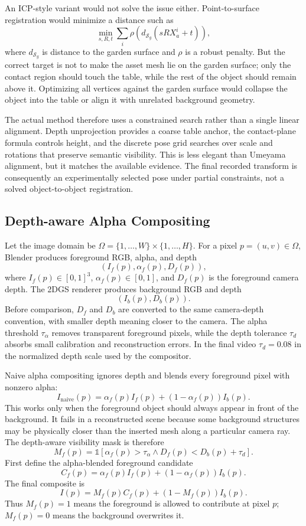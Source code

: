 \documentclass[10pt,twocolumn,letterpaper]{article}
\begin{document}
An ICP-style variant would not solve the issue either.
Point-to-surface registration would minimize a distance such as
\[
\min_{s,R,t}\sum_i
\rho\!\left(
d_{\mathcal{S}_g}(sRX_a^i+t)
\right),
\]
where $d_{\mathcal{S}_g}$ is distance to the garden surface and $\rho$ is a robust penalty.
But the correct target is not to make the asset mesh lie on the garden surface; only the contact region should touch the table, while the rest of the object should remain above it.
Optimizing all vertices against the garden surface would collapse the object into the table or align it with unrelated background geometry.

The actual method therefore uses a constrained search rather than a single linear alignment.
Depth unprojection provides a coarse table anchor, the contact-plane formula controls height, and the discrete pose grid searches over scale and rotations that preserve semantic visibility.
This is less elegant than Umeyama alignment, but it matches the available evidence.
The final recorded transform is consequently an experimentally selected pose under partial constraints, not a solved object-to-object registration.

\subsection{Depth-aware Alpha Compositing}
Let the image domain be $\Omega=\{1,\ldots,W\}\times\{1,\ldots,H\}$.
For a pixel $p=(u,v)\in\Omega$, Blender produces foreground RGB, alpha, and depth
\[
(I_f(p),\alpha_f(p),D_f(p)),
\]
where $I_f(p)\in[0,1]^3$, $\alpha_f(p)\in[0,1]$, and $D_f(p)$ is the foreground camera depth.
The 2DGS renderer produces background RGB and depth
\[
(I_b(p),D_b(p)).
\]
Before comparison, $D_f$ and $D_b$ are converted to the same camera-depth convention, with smaller depth meaning closer to the camera.
The alpha threshold $\tau_\alpha$ removes transparent foreground pixels, while the depth tolerance $\tau_d$ absorbs small calibration and reconstruction errors.
In the final video $\tau_d=0.08$ in the normalized depth scale used by the compositor.

Naive alpha compositing ignores depth and blends every foreground pixel with nonzero alpha:
\[
I_{\mathrm{naive}}(p)
=
\alpha_f(p)I_f(p)+(1-\alpha_f(p))I_b(p).
\]
This works only when the foreground object should always appear in front of the background.
It fails in a reconstructed scene because some background structures may be physically closer than the inserted mesh along a particular camera ray.
The depth-aware visibility mask is therefore
\[
M_f(p)=
\mathbb{1}\left[
\alpha_f(p)>\tau_\alpha
\land
D_f(p)<D_b(p)+\tau_d
\right].
\]
First define the alpha-blended foreground candidate
\[
C_f(p)
=
\alpha_f(p)I_f(p)+(1-\alpha_f(p))I_b(p).
\]
The final composite is
\[
I(p)=M_f(p)C_f(p)+(1-M_f(p))I_b(p).
\]
Thus $M_f(p)=1$ means the foreground is allowed to contribute at pixel $p$; $M_f(p)=0$ means the background overwrites it.
\end{document}

